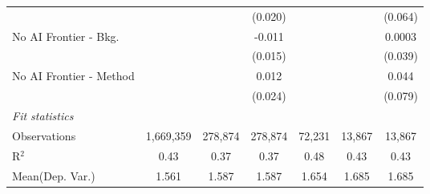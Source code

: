 \begin{tabular}{lcccccc}
                           &               &               & (0.020)       &              &         & (0.064)\\   
   No AI Frontier - Bkg.   &               &               & -0.011        &              &         & 0.0003\\   
                           &               &               & (0.015)       &              &         & (0.039)\\   
   No AI Frontier - Method &               &               & 0.012         &              &         & 0.044\\   
                           &               &               & (0.024)       &              &         & (0.079)\\   
   \midrule
   \emph{Fit statistics}\\
   Observations            & 1,669,359     & 278,874       & 278,874       & 72,231       & 13,867  & 13,867\\  
   R$^2$                   & 0.43          & 0.37          & 0.37          & 0.48         & 0.43    & 0.43\\  
Mean(Dep. Var.) & 1.561 & 1.587 & 1.587 & 1.654 & 1.685 & 1.685 \\
   

\end{tabular}
